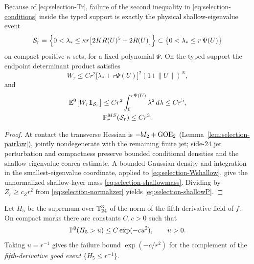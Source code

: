 \begin{lemma}\label{lem:selection-shallow}
Because of \eqref{eq:selection-Tr}, failure of the second inequality in \eqref{eq:selection-conditions} inside the typed support is exactly the physical shallow-eigenvalue event
\begin{equation}\label{eq:selection-shallow}
\mathcal S_r=\Bigl\{0<\lambda_*\le\kappa r\bigl[2KR(U)^5+2R(U)\bigr]\Bigr\}\subset\bigl\{0<\lambda_*\le r\,\Psi(U)\bigr\}
\end{equation}
on compact positive $\kappa$ sets, for a fixed polynomial $\Psi$. On the typed support the endpoint determinant product satisfies
\begin{equation}\label{eq:selection-Wshallow}
W_r\le Cr^2\bigl[\lambda_*+r\Psi(U)\bigr]^2(1+\|U\|)^N ,
\end{equation}
and
\begin{gather}
\mathbb E^0\bigl[W_r\mathbf 1_{\mathcal S_r}\bigr]\le Cr^2\int_0^{r\Psi(U)}\lambda^2\,d\lambda\le Cr^5,\label{eq:selection-shallowmass}\\
\mathbb P^{MS}_r(\mathcal S_r)\le Cr^3 .\label{eq:selection-shallowP}
\end{gather}
\end{lemma}

\begin{proof}
At contact the transverse Hessian is $-bI_2+{\rm GOE}_2$ (Lemma~\ref{lem:selection-pairlaw}), jointly nondegenerate with the remaining finite jet; side-$24$ jet perturbation and compactness preserve bounded conditional densities and the shallow-eigenvalue coarea estimate. A bounded Gaussian density and integration in the smallest-eigenvalue coordinate, applied to \eqref{eq:selection-Wshallow}, give the unnormalized shallow-layer mass \eqref{eq:selection-shallowmass}. Dividing by $Z_r\ge c_Zr^2$ from \eqref{eq:selection-normalizer} yields \eqref{eq:selection-shallowP}.
\end{proof}

\begin{lemma}\label{lem:selection-fifth}
Let $H_5$ be the supremum over $\mathbb T^3_{24}$ of the norm of the fifth-derivative field of $f$. On compact marks there are constants $C,c>0$ such that
\begin{equation}\label{eq:selection-borell}
\mathbb P^0(H_5>u)\le C\exp(-cu^2),\qquad u>0 .
\end{equation}
Taking $u=r^{-1}$ gives the failure bound $\exp(-c/r^2)$ for the complement of the \emph{fifth-derivative good event} $\{H_5\le r^{-1}\}$.
\end{lemma}

